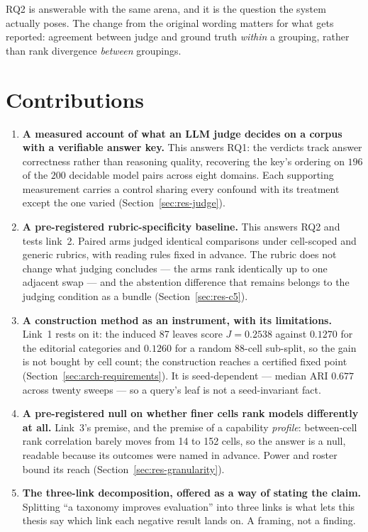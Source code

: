 RQ2 is answerable with the same arena, and it is the question the
system actually poses. The change from the original wording matters for
what gets reported: agreement between judge and ground truth
\emph{within} a grouping, rather than rank divergence \emph{between}
groupings.

\section{Contributions}\label{sec:research-goal}

\begin{enumerate}

    \item \textbf{A measured account of what an LLM judge decides on a
    corpus with a verifiable answer key.} This
    answers RQ1: the verdicts track answer correctness rather than
    reasoning quality, recovering the key's ordering on $196$ of the
    $200$ decidable model pairs across eight domains. Each supporting
    measurement carries a control sharing every confound with its
    treatment except the one varied (Section~\ref{sec:res-judge}).

    \item \textbf{A pre-registered rubric-specificity baseline.}
    This answers RQ2 and tests link~2. Paired arms
    judged identical comparisons under cell-scoped and generic rubrics,
    with reading rules fixed in advance. The rubric does not change
    what judging concludes --- the arms rank identically up to one
    adjacent swap --- and the abstention difference that remains
    belongs to the judging condition as a bundle
    (Section~\ref{sec:res-c5}).

    \item \textbf{A construction method as an instrument, with its
    limitations.} Link~1 rests on it: the induced
    87 leaves score $J = 0.2538$ against $0.1270$ for the editorial
    categories and $0.1260$ for a random 88-cell sub-split, so the
    gain is not bought by cell count; the construction reaches a
    certified fixed point (Section~\ref{sec:arch-requirements}). It is
    seed-dependent --- median ARI $0.677$ across twenty sweeps --- so a
    query's leaf is not a seed-invariant fact.

    \item \textbf{A pre-registered null on whether finer cells rank
    models differently at all.} Link~3's premise,
    and the premise of a capability \emph{profile}: between-cell rank
    correlation barely moves from 14 to 152 cells, so the answer is a
    null, readable because its outcomes were named in advance. Power
    and roster bound its reach (Section~\ref{sec:res-granularity}).

    \item \textbf{The three-link decomposition, offered as a way of
    stating the claim.} Splitting ``a taxonomy
    improves evaluation'' into three links is what lets this thesis
    say which link each negative result lands on. A framing, not a
    finding.

\end{enumerate}

